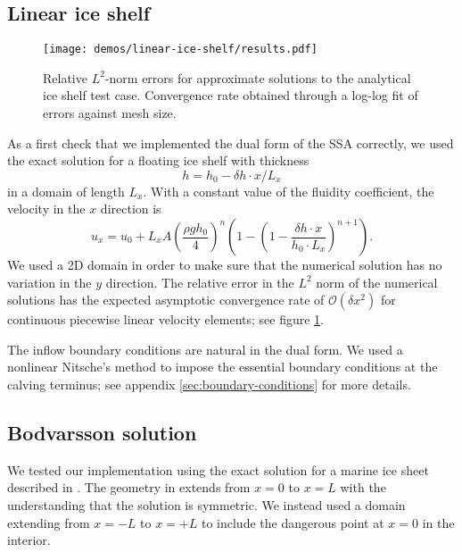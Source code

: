 \documentclass{article}
\theoremstyle{definition}
\theoremstyle{plain}
\begin{document}
\subsection{Linear ice shelf}

\begin{figure}[h]
    \begin{center}
        \texttt{[image: demos/linear-ice-shelf/results.pdf]}
    \end{center}
    \caption{Relative $L^2$-norm errors for approximate solutions to the analytical ice shelf test case.
    Convergence rate obtained through a log-log fit of errors against mesh size.}
    \label{fig:linear-ice-shelf-convergence-rate}
\end{figure}

As a first check that we implemented the dual form of the SSA correctly, we used the exact solution for a floating ice shelf with thickness
\begin{equation}
    h = h_0 - \delta h \cdot x / L_x
\end{equation}
in a domain of length $L_x$.
With a constant value of the fluidity coefficient, the velocity in the $x$ direction is
\begin{equation}
    u_x = u_0 + L_x A \left(\frac{\rho g h_0}{4}\right)^n\left(1 - \left(1 - \frac{\delta h \cdot x}{h_0\cdot L_x}\right)^{n + 1}\right).
\end{equation}
We used a 2D domain in order to make sure that the numerical solution has no variation in the $y$ direction.
The relative error in the $L^2$ norm of the numerical solutions has the expected asymptotic convergence rate of $\mathscr{O}(\delta x^2)$ for continuous piecewise linear velocity elements; see figure \ref{fig:linear-ice-shelf-convergence-rate}.

The inflow boundary conditions are natural in the dual form.
We used a nonlinear Nitsche's method to impose the essential boundary conditions at the calving terminus; see appendix \ref{sec:boundary-conditions} for more details.

\subsection{Bodvarsson solution}

We tested our implementation using the exact solution for a marine ice sheet described in \citet{bueler2014exact}.
The geometry in \citet{bueler2014exact} extends from $x = 0$ to $x = L$ with the understanding that the solution is symmetric.
We instead used a domain extending from $x = -L$ to $x = +L$ to include the dangerous point at $x = 0$ in the interior.
\end{document}

